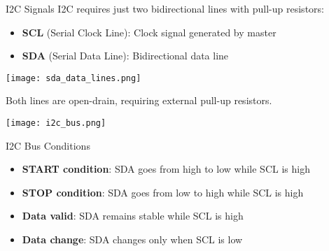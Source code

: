\begin{concept}{I2C Signals}
I2C requires just two bidirectional lines with pull-up resistors:
\begin{itemize}
    \item \textbf{SCL} (Serial Clock Line): Clock signal generated by master
    \item \textbf{SDA} (Serial Data Line): Bidirectional data line
\end{itemize}
\texttt{[image: sda\_data\_lines.png]}

Both lines are open-drain, requiring external pull-up resistors.
\end{concept}

\multend

\texttt{[image: i2c\_bus.png]}



\begin{theorem}{I2C Bus Conditions}
\begin{itemize}
    \item \textbf{START condition}: SDA goes from high to low while SCL is high
    \item \textbf{STOP condition}: SDA goes from low to high while SCL is high
    \item \textbf{Data valid}: SDA remains stable while SCL is high
    \item \textbf{Data change}: SDA changes only when SCL is low
\end{itemize}
\end{theorem}

